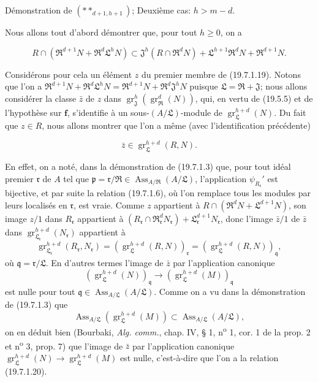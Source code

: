 \begin{env}[19.7.1.18]
\label{IV.19.7.1.18}
Démonstration de $(**_{d+1,h+1})$; Deuxième cas: $h>m-d$.
\end{env}

Nous allons tout d'abord démontrer que, pour tout $h\geq0$, on a
\begin{env}[19.7.1.19]
\label{IV.19.7.1.19}
\[
  R\cap(\mathfrak R^{d+1}N+\mathfrak R^d\mathfrak L^hN)\subset\mathfrak J^h(R\cap\mathfrak R^dN)+\mathfrak L^{h+1}\mathfrak R^dN+\mathfrak R^{d+1}N.
\]
\end{env}

Considérons pour cela un élément $z$ du premier membre de (19.7.1.19). Notons que l'on a $\mathfrak R^{d+1}N+\mathfrak R^d\mathfrak L^hN=\mathfrak R^{d+1}N+\mathfrak R^d\mathfrak J^hN$ puisque $\mathfrak L=\mathfrak R+\mathfrak J$; nous allons considérer la classe $\bar z$ de $z$ dans $\operatorname{gr}_{\mathfrak J}^h(\operatorname{gr}_{\mathfrak R}^d(N))$, qui, en vertu de (19.5.5) et de l'hypothèse sur $\mathbf f$, s'identifie à un sous-$(A/\mathfrak L)$-module de $\operatorname{gr}_{\mathfrak L}^{h+d}(N)$. Du fait que $z\in R$, nous allons montrer que l'on a même (avec l'identification précédente)
\begin{env}[19.7.1.20]
\label{IV.19.7.1.20}
\[
  \bar z\in\operatorname{gr}_{\mathfrak L}^{h+d}(R,N).
\]
\end{env}

En effet, on a noté, dans la démonstration de (19.7.1.3) que, pour tout idéal premier $\mathfrak r$ de $A$ tel que $\mathfrak p=\mathfrak r/\mathfrak R\in\operatorname{Ass}_{A/\mathfrak R}(A/\mathfrak L)$, l'application $\psi_{R_{\mathfrak r}}'$ est bijective, et par suite la relation (19.7.1.6), où l'on remplace tous les modules par leurs localisés en $\mathfrak r$, est vraie. Comme $z$ appartient à $R\cap(\mathfrak R^dN+\mathfrak L^{d+1}N)$, son image $z/1$ dans $R_{\mathfrak r}$ appartient à $(R_{\mathfrak r}\cap\mathfrak R_{\mathfrak r}^dN_{\mathfrak r})+\mathfrak L_{\mathfrak r}^{d+1}N_{\mathfrak r}$, donc l'image $\bar z/1$ de $\bar z$ dans $\operatorname{gr}_{\mathfrak L_{\mathfrak r}}^{h+d}(N_{\mathfrak r})$ appartient à
\[
  \operatorname{gr}_{\mathfrak L_{\mathfrak r}}^{h+d}(R_{\mathfrak r},N_{\mathfrak r})
  =(\operatorname{gr}_{\mathfrak L}^{h+d}(R,N))_{\mathfrak r}
  =(\operatorname{gr}_{\mathfrak L}^{h+d}(R,N))_{\mathfrak q},
\]
où $\mathfrak q=\mathfrak r/\mathfrak L$. En d'autres termes l'image de $\bar z$ par l'application canonique
\[
  (\operatorname{gr}_{\mathfrak L}^{h+d}(N))_{\mathfrak q}\longrightarrow(\operatorname{gr}_{\mathfrak L}^{h+d}(M))_{\mathfrak q}
\]
est nulle pour tout $\mathfrak q\in\operatorname{Ass}_{A/\mathfrak L}(A/\mathfrak L)$. Comme on a vu dans la démonstration de (19.7.1.3) que
\[
  \operatorname{Ass}_{A/\mathfrak L}(\operatorname{gr}_{\mathfrak L}^{h+d}(M))\subset\operatorname{Ass}_{A/\mathfrak L}(A/\mathfrak L),
\]
on en déduit bien (Bourbaki, \emph{Alg. comm.}, chap. IV, § 1, n\textsuperscript{o} 1, cor. 1 de la prop. 2 et n\textsuperscript{o} 3, prop. 7) que l'image de $\bar z$ par l'application canonique $\operatorname{gr}_{\mathfrak L}^{h+d}(N)\to\operatorname{gr}_{\mathfrak L}^{h+d}(M)$ est nulle, c'est-à-dire que l'on a la relation (19.7.1.20).

